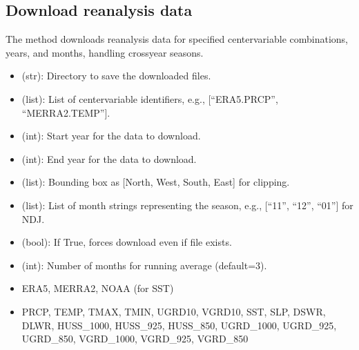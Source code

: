 \documentclass[letterpaper,10pt,english]{sphinxmanual}
\begin{document}
\subsection{Download reanalysis data}
\label{\detokenize{Download:download-reanalysis-data}}
\sphinxAtStartPar
The  method downloads reanalysis data for specified center\sphinxhyphen{}variable combinations, years, and months, handling cross\sphinxhyphen{}year seasons.

\sphinxAtStartPar
{}
\begin{itemize}
\item {} 
\sphinxAtStartPar
{} (str): Directory to save the downloaded files.

\item {} 
\sphinxAtStartPar
{} (list): List of center\sphinxhyphen{}variable identifiers, e.g., {[}“ERA5.PRCP”, “MERRA2.TEMP”{]}.

\item {} 
\sphinxAtStartPar
{} (int): Start year for the data to download.

\item {} 
\sphinxAtStartPar
{} (int): End year for the data to download.

\item {} 
\sphinxAtStartPar
{} (list): Bounding box as {[}North, West, South, East{]} for clipping.

\item {} 
\sphinxAtStartPar
{} (list): List of month strings representing the season, e.g., {[}“11”, “12”, “01”{]} for NDJ.

\item {} 
\sphinxAtStartPar
{} (bool): If True, forces download even if file exists.

\item {} 
\sphinxAtStartPar
{} (int): Number of months for running average (default=3).

\end{itemize}

\sphinxAtStartPar
{}
\begin{itemize}
\item {} 
\sphinxAtStartPar
{} ERA5, MERRA2, NOAA (for SST)

\item {} 
\sphinxAtStartPar
{} PRCP, TEMP, TMAX, TMIN, UGRD10, VGRD10, SST, SLP, DSWR, DLWR, HUSS\_1000, HUSS\_925, HUSS\_850, UGRD\_1000, UGRD\_925, UGRD\_850, VGRD\_1000, VGRD\_925, VGRD\_850

\end{itemize}
\end{document}
